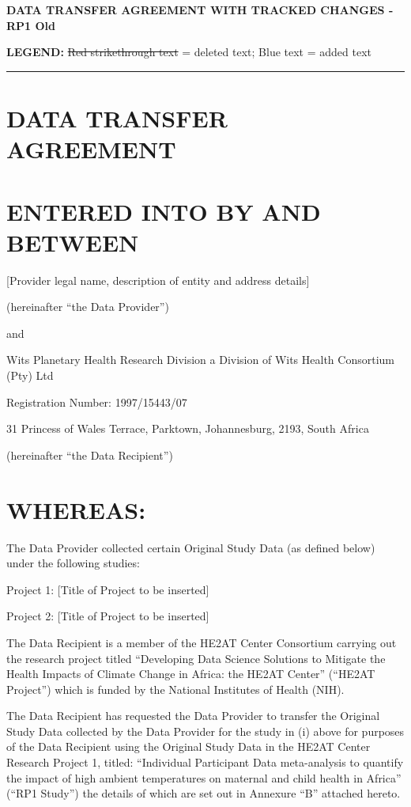 \documentclass[12pt,letterpaper]{article}
\newcommand{\deleted}[1]{\textcolor{deletecolor}{\sout{#1}}}
\newcommand{\added}[1]{\textcolor{addcolor}{#1}}
\begin{document}
\onehalfspacing
\begin{center}
\textbf{\Large DATA TRANSFER AGREEMENT WITH TRACKED CHANGES - RP1 Old}
\end{center}
\textbf{LEGEND:} \deleted{Red strikethrough text} = deleted text; \added{Blue text} = added text
\vspace{0.5cm}
\hrule
\vspace{0.5cm}
\section*{DATA TRANSFER AGREEMENT}

\section*{ENTERED INTO BY AND BETWEEN}

[Provider legal name, description of entity and address details]

(hereinafter “the Data Provider”)

and

Wits Planetary Health Research Division a Division of Wits Health Consortium (Pty) Ltd

Registration Number: 1997/15443/07

31 Princess of Wales Terrace, Parktown, Johannesburg, 2193, South Africa

(hereinafter “the Data Recipient”)

\section*{WHEREAS:}

The Data Provider collected certain Original Study Data (as defined below) under the following studies:

Project 1: [Title of Project to be inserted]

Project 2: [Title of Project to be inserted]

The Data Recipient is a member of the HE2AT Center Consortium carrying out the research project titled “Developing Data Science Solutions to Mitigate the Health Impacts of Climate Change in Africa: the HE2AT Center” (“HE2AT Project”) which is funded by the National Institutes of Health (NIH).

The Data Recipient has requested the Data Provider to transfer the Original Study Data collected by the Data Provider for the study in (i) above for purposes of the Data Recipient using the Original Study Data in the HE2AT Center Research Project 1, titled: “Individual Participant Data meta-analysis to quantify the impact of high ambient temperatures on maternal and child health in Africa” (“RP1 Study”) the details of which are set out in Annexure “B” attached hereto.
\end{document}
